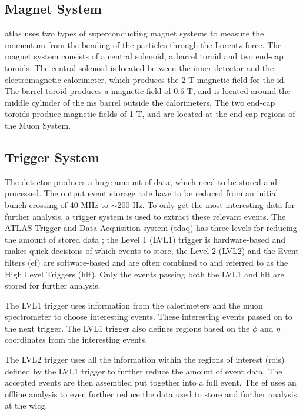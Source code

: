 \documentclass[a4paper, american, 12pt]{report}
\begin{document}
	
	\subsection{Magnet System}
	\label{subsect:Theory-MagnetSystem}
	\acrshort{atlas} uses two types of superconducting magnet systems to measure the momentum from the bending of the particles through the Lorentz force. The magnet system consists of a central solenoid, a barrel toroid and two end-cap toroids. The central solenoid is located between the inner detector and the electromagnetic calorimeter, which produces the 2 T magnetic field for the \acrshort{id}. The barrel toroid produces a magnetic field of 0.6 T, and is located around the middle cylinder of the \acrshort{ms} barrel outside the calorimeters. The two end-cap toroids produce magnetic fields of 1 T, and are located at the end-cap regions of the Muon System.
	
	
	\subsection{Trigger System}
	\label{subsect:Theory-TriggerSystem}
	The detector produces a huge amount of data, which need to be stored and processed. The output event storage rate have to be reduced from an initial bunch crossing of 40 MHz to $\sim$200 Hz. To only get the most interesting data for further analysis, a trigger system is used to extract these relevant events. The ATLAS Trigger and Data Acquisition system (\acrshort{tdaq}) has three levels for reducing the amount of stored data \cite{scannicchio2010atlas}; the Level 1 (LVL1) trigger is hardware-based and makes quick decisions of which events to store, the Level 2 (LVL2) and the Event filters (\acrshort{ef}) are software-based and are often combined to and referred to as the High Level Triggers (\acrshort{hlt}). Only the events passing both the LVL1 and \acrshort{hlt} are stored for further analysis.
	
	The LVL1 trigger uses information from the calorimeters and the muon spectrometer to choose interesting events. These interesting events passed on to the next trigger. The LVL1 trigger also defines regions based on the $\phi$ and $\eta$ coordinates from the interesting events.
	
	The LVL2 trigger uses all the information within the regions of interest (\acrshort{roi}s) defined by the LVL1 trigger to further reduce the amount of event data. The accepted events are then assembled put together into a full event. The \acrshort{ef} uses an offline analysis to even further reduce the data used to store and further analysis at the \acrshort{wlcg}. 
\end{document}

